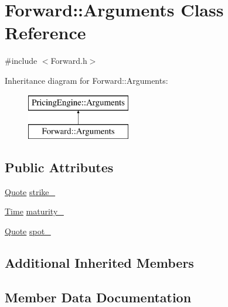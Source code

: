 \hypertarget{class_forward_1_1_arguments}{}\section{Forward\+:\+:Arguments Class Reference}
\label{class_forward_1_1_arguments}


{\ttfamily \#include $<$Forward.\+h$>$}

Inheritance diagram for Forward\+:\+:Arguments\+:\begin{figure}[H]
\begin{center}
\leavevmode
\includegraphics[height=2.000000cm]{class_forward_1_1_arguments}
\end{center}
\end{figure}
\subsection*{Public Attributes}
\begin{DoxyCompactItemize}
\item 
\hyperlink{_name_def_8h_a642a6c5fd87319d922637de0e0bb0305}{Quote} \hyperlink{class_forward_1_1_arguments_acc295ee300d99631259b82448bc1184c}{strike\+\_\+}
\item 
\hyperlink{_name_def_8h_ac2d3e0ba793497bcca555c7c2cf64ff3}{Time} \hyperlink{class_forward_1_1_arguments_abfbb5b4259781ef08e2b48ff4247a484}{maturity\+\_\+}
\item 
\hyperlink{_name_def_8h_a642a6c5fd87319d922637de0e0bb0305}{Quote} \hyperlink{class_forward_1_1_arguments_a407ca35969703b95866bc0c68d49d631}{spot\+\_\+}
\end{DoxyCompactItemize}
\subsection*{Additional Inherited Members}


\subsection{Member Data Documentation}
\hypertarget{class_forward_1_1_arguments_abfbb5b4259781ef08e2b48ff4247a484}{}\label{class_forward_1_1_arguments_abfbb5b4259781ef08e2b48ff4247a484} 
